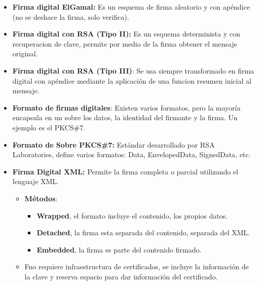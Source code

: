 \documentclass[12pt, twoside, openright]{report} %
\begin{document}
\begin{itemize}
\begin{itemize}
      \end{itemize}
    \item \textbf{Firma digital ElGamal:} Es un esquema de firma aleatorio y
      con apéndice (no se deshace la firma, solo verifica).
      
    \item \textbf{Firma digital con RSA (Tipo II):} Es un esquema
      determinista y con recuperacion de clave, permite por medio de la
      firma obtener el mensaje original.
      
    \item \textbf{Firma digital con RSA (Tipo III)}: Se usa siempre
      transformado en firma digital con apéndice mediante la aplicación
      de una funcion resumen inicial al mensaje.
      
    \item \textbf{Formato de firmas digitales}: Existen varios formatos,
      pero la mayoría encapsula en un sobre los datos, la identidad del
      firmante y la firma. Un ejemplo es el PKCS\#7.
      
    \item \textbf{Formato de Sobre PKCS\#7:} Estándar desarrollado por RSA
      Laboratories, define varios formatos: Data, EnvelopedData,
      SignedData, etc.
      
    \item \textbf{Firma Digital XML:} Permite la firma completa o parcial
      utilizando el lenguaje XML.
      

      \begin{itemize}
      \item \textbf{Métodos}:
        

        \begin{itemize}
        \item \textbf{Wrapped}, el formato incluye el contenido, los propios
          datos.
          
        \item \textbf{Detached}, la firma esta separada del contenido,
          separada del XML.
          
        \item \textbf{Embedded}, la firma es parte del contenido firmado.
          
        \end{itemize}
      \item Fno requiere infraestructura de certificados, se incluye la
        información de la clave y reserva espacio para dar información
        del certificado.
        
      \end{itemize}
    \end{itemize}
\end{document}
